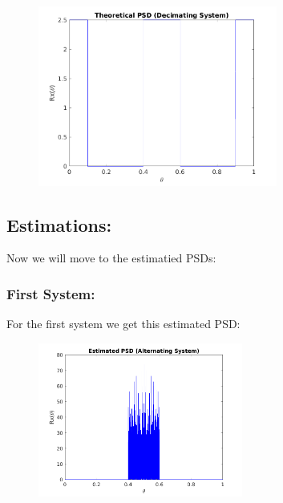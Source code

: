 \documentclass[a4paper,11pt]{article}
\begin{document}
\begin{figure}[!hp]
    \begin{center}
      \includegraphics[width=0.7\textwidth]{images/study4/R_th_d.png}
    \end{center}
\end{figure}

\newpage

\subsection{Estimations:}

Now we will move to the estimatied PSDs:

\subsubsection{First System:}

For the first system we get this estimated PSD:

\begin{figure}[!hp]
    \begin{center}
      \includegraphics[width=0.6\textwidth]{images/study4/R_es_a.png}
    \end{center}
\end{figure}
\end{document}
